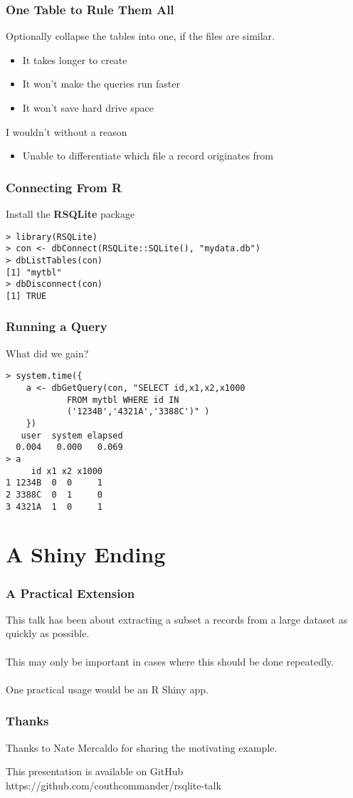 \documentclass{beamer}
\begin{document}
\begin{frame}[fragile=singleslide]
\frametitle{One Table to Rule Them All}
Optionally collapse the tables into one, if the files are similar.
    \begin{itemize}
    \item It takes longer to create
    \item It won't make the queries run faster
    \item It won't save hard drive space
    \end{itemize}
I wouldn't without a reason
    \begin{itemize}
    \item Unable to differentiate which file a record originates from
    \end{itemize}
\end{frame}

\begin{frame}[fragile=singleslide]
\frametitle{Connecting From R}
Install the \textbf{RSQLite} package
\begin{verbatim}
> library(RSQLite)
> con <- dbConnect(RSQLite::SQLite(), "mydata.db")
> dbListTables(con)
[1] "mytbl"
> dbDisconnect(con)
[1] TRUE
\end{verbatim}
\end{frame}

\begin{frame}[fragile=singleslide]
\frametitle{Running a Query}
What did we gain?
\begin{verbatim}
> system.time({
    a <- dbGetQuery(con, "SELECT id,x1,x2,x1000
            FROM mytbl WHERE id IN 
            ('1234B','4321A','3388C')" )
    })
   user  system elapsed 
  0.004   0.000   0.069 
> a
     id x1 x2 x1000
1 1234B  0  0     1
2 3388C  0  1     0
3 4321A  1  0     1
\end{verbatim}
\end{frame}

\section{A Shiny Ending}
\begin{frame}
\frametitle{A Practical Extension}
This talk has been about extracting a subset a records from a large dataset as quickly as possible.\\~\\
This may only be important in cases where this should be done repeatedly.\\~\\
One practical usage would be an R Shiny app.
\end{frame}

\begin{frame}
\frametitle{Thanks}
Thanks to Nate Mercaldo for sharing the motivating example.
    \begin{block}{This presentation is available on GitHub}
    https://github.com/couthcommander/rsqlite-talk
    \end{block}
\end{frame}
\end{document}
